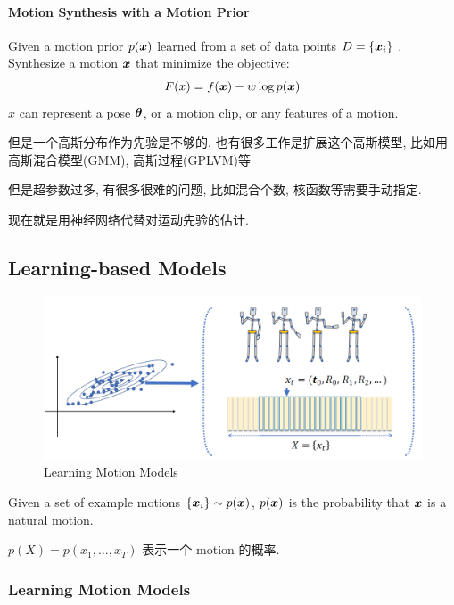 \paragraph{Motion Synthesis with a Motion Prior}Given a motion prior $p({\bm{x}})$ learned from a set of data points $D=\{ {\bm{x}}_i \}$ , Synthesize a motion ${\bm{x}}$ that minimize the objective:
\begin{align*}
    F(x)=f({\bm{x}})-w\log p({\bm{x}})
\end{align*}
$x$ can represent a pose ${\bm{\theta}}$, or a motion clip, or any features of a motion.

但是一个高斯分布作为先验是不够的. 也有很多工作是扩展这个高斯模型, 比如用高斯混合模型(GMM), 高斯过程(GPLVM)等

但是超参数过多, 有很多很难的问题, 比如混合个数, 核函数等需要手动指定. 

现在就是用神经网络代替对运动先验的估计. 

\subsection{Learning-based Models}
\begin{figure}[!htb]
    \centering
    \includegraphics[width=0.618\linewidth]{pic/1056/Learning Motion Models}
    \caption{Learning Motion Models}
\end{figure}


Given a set of example motions $\{{\bm{x}}_i\}\sim p({\bm{x}})$, $p({\bm{x}})$ is the probability that ${\bm{x}}$ is a natural motion.

$p(X)=p(x_1,\dots,x_T)$ 表示一个 motion 的概率. 

\subsubsection{Learning Motion Models}

